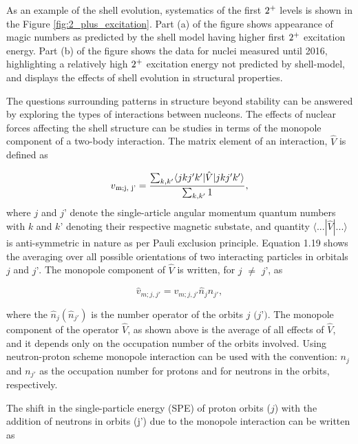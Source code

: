 \documentclass[a4paper,12pt,twoside]{report}
\begin{document}
As an example of the shell evolution, systematics of the first $2\textsuperscript{+}$ levels is shown in the Figure \ref{fig:2_plus_excitation}. Part (a) of the figure shows appearance of magic numbers as predicted by the shell model having higher first $2\textsuperscript{+}$ excitation energy. Part (b) of the figure shows the data for nuclei measured until 2016, highlighting a relatively high $2\textsuperscript{+}$ excitation energy not predicted by shell-model, and displays the effects of shell evolution in structural properties.

The questions surrounding patterns in structure beyond stability can be answered by exploring the types of interactions between nucleons. The effects of nuclear forces affecting the shell structure can be studies in terms of the monopole component of a two-body interaction. The matrix element of an interaction, $\hat V$ is defined as 

\begin{equation}
    v\textsubscript{m;j, j'} = \frac{\sum_{k, k'}^{}\langle jkj'k'|\hat V|jkj'k'\rangle}{\sum_{k, k'}^{}1},
\end{equation}
where $\textit{j}$ and $\textit{j'}$  denote the single-article angular momentum quantum numbers with $\textit{k}$ and $\textit{k'}$ denoting their respective magnetic substate, and quantity $\langle ...|\hat V|...\rangle$ is anti-symmetric in nature as per Pauli exclusion principle. Equation 1.19 shows the averaging over all possible orientations of two interacting particles in orbitals $\textit{j}$ and $\textit{j'}$. The monopole component of $\hat V$ is written, for $\textit{j}$ $\not=$ $\textit{j'}$, as 

\begin{equation}
    \hat v_{m; j, j'} = v_{m;j,j'}\hat n_{j} \hat n_{j'},
\end{equation}


where the $\hat n_{j} (\hat n_{j'})$ is the number operator of the orbits $\textit{j (j')}$. The monopole component of the operator $\hat V$, as shown above is the average of all effects of $\hat V$, and it depends only on the occupation number of the orbits involved. Using neutron-proton scheme monopole interaction can be used with the convention: $n_{j}$ and $n_{j'}$ as the occupation number for protons and for neutrons in the orbits, respectively.


The shift in the single-particle energy (SPE) of proton orbits ($\textit{j}$) with the addition of neutrons in orbits (j') due to the monopole interaction can be written as 
\end{document}
